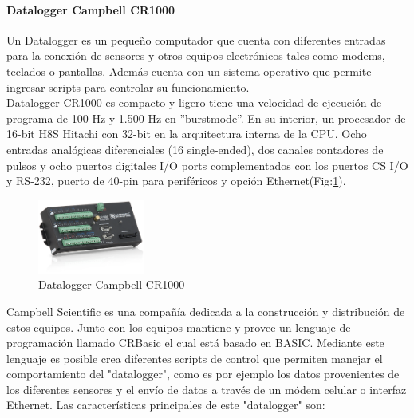 \paragraph{Datalogger Campbell CR1000}
Un Datalogger es un pequeño computador que cuenta con diferentes entradas para la conexión de sensores y otros equipos electrónicos tales como modems, teclados o pantallas. Además cuenta con un sistema operativo que permite ingresar scripts para controlar su funcionamiento.\\Datalogger CR1000 es compacto y ligero tiene una velocidad de ejecución de programa de 100 Hz y 1.500 Hz en ''burstmode''. En su interior, un procesador de 16-bit H8S Hitachi con 32-bit en la arquitectura interna de la CPU.
Ocho entradas analógicas diferenciales (16 single-ended), dos canales contadores
de pulsos y ocho puertos digitales I/O ports complementados con los puertos CS I/O y RS-232, puerto de 40-pin para periféricos y opción Ethernet(Fig:\ref{cr1000}).

\begin{figure}[h!]
	\centering
	\includegraphics[width=100pt]{images/cr1000}
	\caption{Datalogger Campbell CR1000}
	\label{cr1000}
\end{figure}

Campbell Scientific es una compañía dedicada a la construcción y distribución de estos equipos. Junto con los equipos mantiene y provee un lenguaje de programación llamado CRBasic el cual está basado en BASIC\cite{hardware:basic}. Mediante este lenguaje es posible crea diferentes scripts de control que permiten manejar el comportamiento del "datalogger", como es por ejemplo los datos provenientes de los diferentes sensores y el envío de datos a través de un módem celular o interfaz Ethernet. Las características principales de este "datalogger" son:

